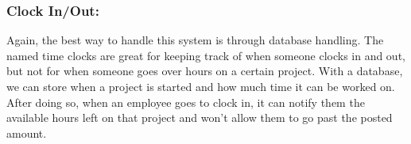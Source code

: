 \documentclass[letterpaper,10pt,titlepage,journal,compsoc,draftclsnofoot,onecolumn]{IEEEtran}
\newcommand\tab[1][1cm]{\hspace*{#1}}
\begin{document}
\subsubsection{Clock In/Out:}
\tab Again, the best way to handle this system is through database handling. The named time clocks are great for keeping track of when someone clocks in and out, but not for when someone goes over hours on a certain project. With a database, we can store when a project is started and how much time it can be worked on. After doing so, when an employee goes to clock in, it can notify them the available hours left on that project and won’t allow them to go past the posted amount. \newline
\end{document}
